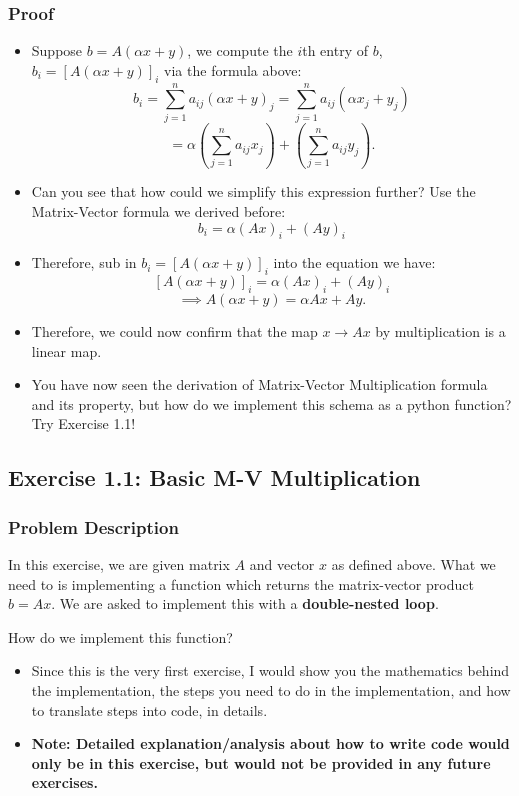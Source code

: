 \subsubsection*{Proof}
\begin{itemize}
    \item Suppose $b = A(\alpha x + y)$, we compute the $i$th entry of $b$,  $b_i = [A(\alpha x + y)]_{i}$ via the formula above:
      \[
        b_i = \sum_{j = 1}^{n} a_{ij}(\alpha x + y)_j =  \sum_{j = 1}^{n} a_{ij}(\alpha x_j + y_j)
      \]
      \[
        = \alpha(\sum_{j = 1}^{n} a_{ij} x_j) + (\sum_{j = 1}^{n} a_{ij} y_{j})
      .\]
    \item Can you see that how could we simplify this expression further? Use the Matrix-Vector formula we derived before:
      \[
        b_i = \alpha (Ax)_i + (Ay)_i
      \]
    \item Therefore, sub in $b_i = [A(\alpha x + y)]_i$ into the equation we have:
      \[
        [A(\alpha x + y)]_i = \alpha (Ax)_i + (Ay)_i
      \]
      \[
        \implies A(\alpha x + y) = \alpha Ax + Ay
      .\]
    \item Therefore, we could now confirm that the map $x \to Ax$ by multiplication is a linear map.
    \item You have now seen the derivation of Matrix-Vector Multiplication formula and its property, but how do we implement this schema as a python function? Try Exercise 1.1!
\end{itemize}

\subsection*{Exercise 1.1: Basic M-V Multiplication}%
\subsubsection*{Problem Description}
In this exercise, we are given matrix $A$ and vector $x$ as defined above. What we need to is implementing a function which returns the matrix-vector product $b = Ax$. We are asked to implement this with a \textbf{double-nested loop}.

\smallskip
\noindent How do we implement this function? 

\begin{itemize}
  \item Since this is the very first exercise, I would show you the mathematics behind the implementation, the steps you need to do in the implementation, and how to translate steps into code, in details. 
  \item \textbf{Note: Detailed explanation/analysis about how to write code would only be in this exercise, but would not be provided in any future exercises.}
\end{itemize}
